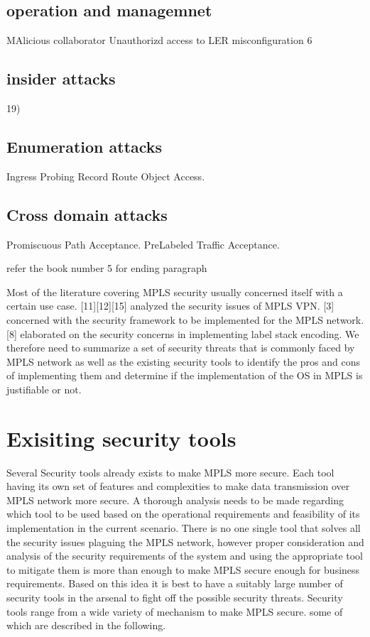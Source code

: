 \subsection{operation and managemnet}
	MAlicious collaborator
   	Unauthorizd access to LER
    misconfiguration 6

\subsection{insider attacks}

19)
\subsection{Enumeration attacks}
	Ingress Probing
    Record Route Object Access.
\subsection{Cross domain attacks}
	Promiscuous Path Acceptance.
    Pre­Labeled Traffic Acceptance.

refer the book number 5 for ending paragraph

Most of the literature covering MPLS security usually concerned itself with a certain use case. \cite{GRAYSON2009146} [11][12][15] analyzed the security issues of MPLS VPN. [3] concerned with the security framework to be implemented for the MPLS network. [8] elaborated on the security concerns in implementing label stack encoding. We therefore need to summarize a set of security threats that is commonly faced by MPLS network as well as the existing security tools to identify the pros and cons of implementing them and determine if the implementation of the OS in MPLS is justifiable or not.

\section{Exisiting security tools}
Several Security tools already exists to make MPLS more secure. Each tool having its own set of features and complexities to make data transmission over MPLS network more secure. A thorough analysis needs to be made regarding which tool to be used based on the operational requirements and feasibility of its implementation in the current scenario. There is no one single tool that solves all the security issues plaguing the MPLS network, however proper consideration and analysis of the security requirements of the system and using the appropriate tool to mitigate them is more than enough to make MPLS secure enough for business requirements. Based on this idea it is best to have a suitably large number of security tools in the arsenal to fight off the possible security threats. Security tools range from a wide variety of mechanism to make MPLS secure. some of which are described in the following.

